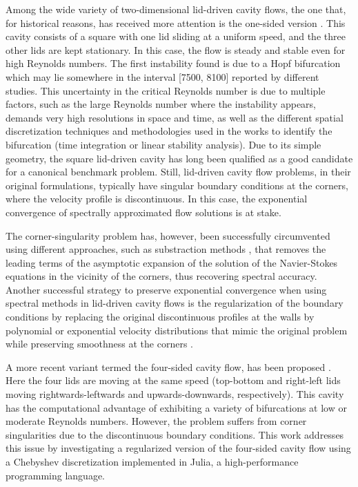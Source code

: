 Among the wide variety of two-dimensional lid-driven cavity flows, the one
that, for historical reasons, has received more attention is the one-sided
version \citep{kuhlmann2019}. This cavity consists of a square with one lid
sliding at a uniform speed, and the three other lids are kept stationary. In
this case, the flow is steady and stable even for high Reynolds numbers. The
first instability found is due to a Hopf bifurcation which may lie somewhere in
the interval [7500, 8100] \citep{kuhlmann2019} reported by different
studies. This uncertainty in the critical Reynolds number is due to multiple
factors, such as the large Reynolds number where the instability appears,
demands very high resolutions in space and time, as well as the different
spatial discretization techniques and methodologies used in the works to
identify the bifurcation (time integration or linear stability analysis). Due
to its simple geometry, the square lid-driven cavity has long been qualified as
a good candidate for a canonical benchmark problem. Still, lid-driven cavity
flow problems, in their original formulations, typically have singular boundary
conditions at the corners, where the velocity profile is discontinuous. In this
case, the exponential convergence of spectrally approximated flow solutions is
at stake. 

The corner-singularity problem has, however, been successfully circumvented
using different approaches, such as substraction methods \citep{botella1998},
that removes the leading terms of the asymptotic expansion of the solution of
the Navier-Stokes equations in the vicinity of the corners, thus recovering
spectral accuracy. Another successful strategy to preserve exponential
convergence when using spectral methods in lid-driven cavity flows is the
regularization of the boundary conditions by replacing the original
discontinuous profiles at the walls by polynomial or exponential velocity
distributions that mimic the original problem while preserving smoothness at
the corners \citep{shen1991, lopez2017}.

A more recent variant termed the four-sided cavity flow, has been proposed
\citep{wahba2009}. Here the four lids are moving at the same speed (top-bottom
and right-left lids moving rightwards-leftwards and upwards-downwards,
respectively). This cavity has the computational advantage of exhibiting a
variety of bifurcations at low or moderate Reynolds numbers. However, the
problem suffers from corner singularities due to the discontinuous boundary
conditions. This work addresses this issue by investigating a regularized
version of the four-sided cavity flow using a Chebyshev discretization
implemented in Julia, a high-performance programming language.

